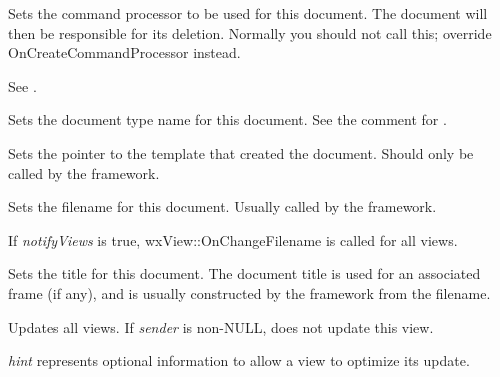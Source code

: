 Sets the command processor to be used for this document. The document will then be responsible
for its deletion. Normally you should not call this; override OnCreateCommandProcessor
instead.

See .



Sets the document type name for this document. See the comment for .



Sets the pointer to the template that created the document. Should only be called by the
framework.



Sets the filename for this document. Usually called by the framework.

If {\it notifyViews} is true, wxView::OnChangeFilename is called for all views.



Sets the title for this document. The document title is used for an associated
frame (if any), and is usually constructed by the framework from
the filename.

\label{wxdocumentupdateallviews}


Updates all views. If {\it sender} is non-NULL, does not update this view.

{\it hint} represents optional information to allow a view to optimize its update.

